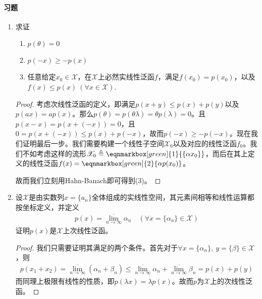 \paragraph{习题}
\begin{enumerate}[leftmargin=2cm, label=\arabic*]
    \item 求证
    \begin{enumerate}[leftmargin=1cm, label=(\arabic*)]
        \item $p(\theta) = 0$
        \item $p(-x) \geqslant -p(x)$
        \item 任意给定$x_0\in\mathscr{X}$，在$\mathscr{X}$上必然实线性泛函$f$，满足$f(x_0) = p(x_0)$，以及$f(x)\leqslant p(x)\ (\forall x\in\mathscr{X})$.
    \end{enumerate}
    \begin{proof}
        考虑次线性泛函的定义，即满足$p(x+y)\leqslant p(x) + p(y)$以及$p(ax) = ap(x)$。那么$p(\theta) = p(\theta \lambda) = \theta p(\lambda) = 0$。且$p(x-x) = p(x + (-x)) = 0$，且$0 = p(x+ (-x))\leqslant p(x) + p(-x) $，故而$p(-x)\geqslant -p(-x)$。现在我们证明最后一步。我们需要构建一个线性子空间$\mathscr{X}_0$以及对应的线性泛函$f_0$。我们不如考虑这样的流形$\mathscr{X}_0 \triangleq \eqnmarkbox[green]{1}{\{\alpha x_0\}}$，而后在其上定义的线性泛函$f(x) = \eqnmarkbox[green]{2}{\alpha p(x_0)}$。
        \vspace{1.5em}
        
        故而我们立刻用Hahn-Banach即可得到(3)。
    \end{proof}
    \item 设$\mathscr{X}$是由实数列$x = \{a_n\}$全体组成的实线性空间，其元素间相等和线性运算都按坐标定义，并定义
    \begin{align*}
        p(x) = \overline{\lim\limits_{n\to\infty}} \alpha_n \quad (\forall x = \{\alpha_n\}\in \mathscr{X})
    \end{align*}
    证明$p(x)$是$\mathscr{X}$上次线性泛函。
    \begin{proof}
        我们只需要证明其满足的两个条件。首先对于$\forall x = \{\alpha_n\},\ y=\{\beta\}\in\mathscr{X}$，则
        \begin{align*}
            p(x_1 + x_2) = \overline{\lim\limits_{n\to\infty}} (\alpha_n + \beta_n) \leqslant \overline{\lim\limits_{n\to\infty}} \alpha_n + \overline{\lim\limits_{n\to\infty}} \beta_n = p(x) + p(y)
        \end{align*}
        而同理上极限有线性的性质，即$p(\lambda x) = \lambda p(x)$。故而$p$为$\mathscr{X}$上的次线性泛函。
    \end{proof}


\end{enumerate}
